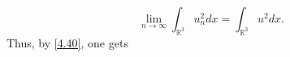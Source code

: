 \[ \label{4.43}
\lim_{n\to\infty} \int_{\mathbb{R}^3} {u^2_n} dx= \int_{\mathbb{R}^3} {u^2} dx.
\]
Thus, by \eqref{4.40}, one gets
